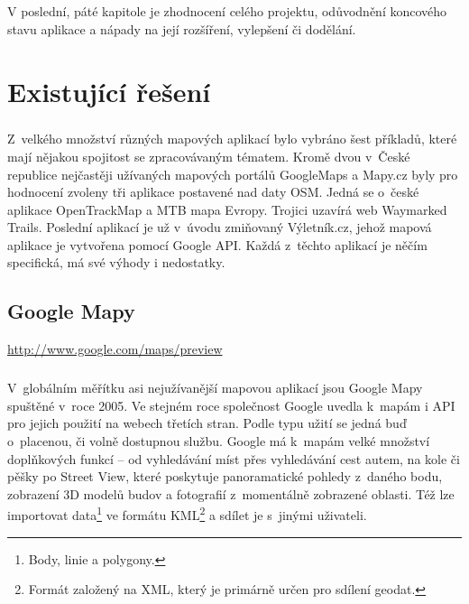 \documentclass[11pt,a4paper,titlepage,oneside]{book}
\begin{document}
	\paragraph{}V poslední, páté kapitole je zhodnocení celého projektu, odůvodnění koncového stavu aplikace a nápady na její rozšíření, vylepšení či dodělání.
	
\pagestyle{fancy}

\chapter{Existující řešení}
	\label{sec:Ex_reseni}
	\paragraph{} Z~velkého množství různých mapových aplikací bylo vybráno šest příkladů, které mají nějakou spojitost se zpracovávaným tématem. Kromě dvou v~České republice nejčastěji užívaných mapových portálů GoogleMaps a Mapy.cz byly pro hodnocení zvoleny tři aplikace postavené nad daty \ac{OSM}. Jedná se o~české aplikace OpenTrackMap a MTB mapa Evropy. Trojici uzavírá web Waymarked Trails. Poslední aplikací je už v~úvodu zmiňovaný Výletník.cz, jehož mapová aplikace je vytvořena pomocí Google \ac{API}. Každá z~těchto aplikací je něčím specifická, má své výhody i nedostatky. 
	\section{Google Mapy}
		\url{http://www.google.com/maps/preview}

                


		\paragraph{} V~globálním měřítku asi nejužívanější mapovou aplikací jsou Google Mapy spuštěné v~roce 2005. Ve stejném roce společnost Google uvedla k~mapám i \ac{API} pro jejich použití na webech třetích stran. Podle typu užití se jedná buď o~placenou, či volně dostupnou službu. Google má k~mapám velké množství doplňkových funkcí -- od vyhledávání míst přes vyhledávání cest autem, na kole či pěšky po Street View, které poskytuje panoramatické pohledy z~daného bodu, zobrazení 3D modelů budov a fotografií z~momentálně zobrazené oblasti. Též lze importovat data\footnote{Body, linie a polygony.} ve formátu \ac{KML}\footnote{Formát založený na \ac{XML}, který je primárně určen pro sdílení geodat.} a sdílet je s~jinými uživateli.
\end{document}
